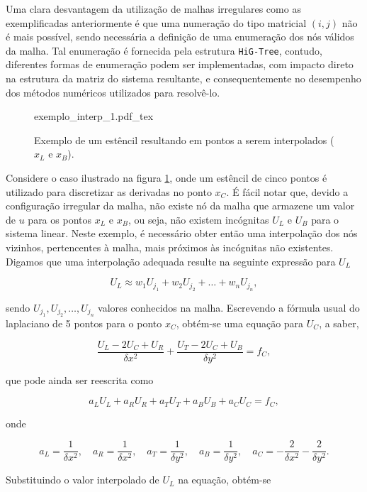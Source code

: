 Uma clara desvantagem da utilização de malhas irregulares como as
exemplificadas anteriormente é que uma numeração do tipo matricial $(i,j)$ não
é mais possível, sendo necessária a definição de uma enumeração dos nós válidos
da malha. Tal enumeração é fornecida pela estrutura \texttt{HiG-Tree}, contudo,
diferentes formas de enumeração podem ser implementadas, com impacto direto na
estrutura da matriz do sistema resultante, e consequentemente no desempenho dos
métodos numéricos utilizados para resolvê-lo.

\begin{figure}
	\centering
	\def\svgscale{0.55}
	{exemplo_interp_1.pdf_tex}
	\caption{Exemplo de um estêncil resultando em pontos a serem interpolados ($x_L$ e $x_B$).}
	\label{fig:exemplo_interp_1}
\end{figure}

Considere o caso ilustrado na figura \ref{fig:exemplo_interp_1}, onde um
estêncil de cinco pontos é utilizado para discretizar as derivadas no ponto
$x_C$. É fácil notar que, devido a configuração irregular da malha, não existe
nó da malha que armazene um valor de $u$ para os pontos $x_L$ e $x_B$, ou seja,
não existem incógnitas $U_L$ e $U_B$ para o sistema linear. Neste exemplo, é
necessário obter então uma interpolação dos nós vizinhos, pertencentes à malha,
mais próximos às incógnitas não existentes. Digamos que uma interpolação
adequada resulte na seguinte expressão para $U_L$

\[
U_L \approx w_1 U_{j_1} + w_2 U_{j_2} + \dots + w_n U_{j_n},
\]

sendo $U_{j_1}, U_{j_2}, \dots , U_{j_n}$ valores conhecidos na malha.
Escrevendo a fórmula usual do laplaciano de 5 pontos para o ponto $x_C$,
obtém-se uma equação para $U_C$, a saber,

\[
\frac{U_{L} - 2 U_{C} + U_{R}}{\delta x^2} + \frac{U_{T} - 2 U_{C} + U_{B}}{\delta y^2} = f_{C},
\]

\noindent que pode ainda ser reescrita como

\[
a_L U_{L} + a_R U_{R} + a_T U_{T} + a_B U_{B} + a_C U_{C}  = f_{C},
\]

\noindent onde

\[
a_L = \frac{1}{\delta x^2}, \quad a_R = \frac{1}{\delta x^2}, \quad a_T = \frac{1}{\delta y^2}, \quad a_B = \frac{1}{\delta y^2}, \quad a_C = -\frac{2}{\delta x^2} - \frac{2}{\delta y^2}.
\]

Substituindo o valor interpolado de $U_L$ na equação, obtém-se


